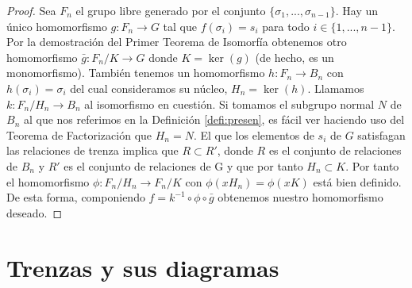 \documentclass[12pt]{book}
\theoremstyle{definition}
\begin{document}
\begin{proof} Sea $F_n$ el grupo libre generado por el conjunto $\{\sigma_1,...,\sigma_{n-1}\}$. Hay un único homomorfismo $g:F_n\rightarrow G$ tal que $f(\sigma_i)= s_i$ para todo $i\in\{1,...,n-1\}$. Por la demostración del Primer Teorema de Isomorfía obtenemos otro homomorfismo $\bar{g}:F_n/K\rightarrow G$ donde $K=\ker(g)$ (de hecho, es un monomorfismo). También tenemos un homomorfismo $h:F_n\rightarrow B_n$ con $h(\sigma_i)=\sigma_i$ del cual consideramos su núcleo, $H_n=\ker(h)$. Llamamos $k:F_n/H_n\rightarrow B_n$ al isomorfismo en cuestión. Si tomamos el subgrupo normal $N$ de $B_n$ al que nos referimos en la Definición \ref{defi:presen}, es fácil ver haciendo uso del Teorema de Factorización que $H_n = N$. El que los elementos de $s_i$ de $G$ satisfagan las relaciones de trenza implica que $R\subset R'$, donde $R$ es el conjunto de relaciones de $B_n$ y $R'$ es el conjunto de relaciones de G y que por tanto $H_n\subset K$. Por tanto el homomorfismo $\phi:F_n/H_n\rightarrow F_n/K$ con $\phi(xH_n)=\phi(xK)$ está bien definido. De esta forma, componiendo $f=k^{-1}\circ \phi \circ \bar{g}$ obtenemos nuestro homomorfismo deseado.
\end{proof}



\section{Trenzas y sus diagramas}
\end{document}
